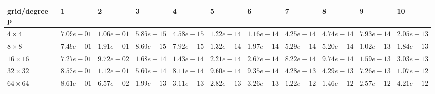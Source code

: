 \begin{tabular}{lllllllllll}
\hline
 grid/degree p   & 1          & 2          & 3          & 4          & 5          & 6          & 7          & 8          & 9          & 10         \\
\hline
 $4 \times 4$    & $7.09e-01$ & $1.06e-01$ & $5.86e-15$ & $4.58e-15$ & $1.22e-14$ & $1.16e-14$ & $4.25e-14$ & $4.74e-14$ & $7.93e-14$ & $2.05e-13$ \\
 $8 \times 8$    & $7.49e-01$ & $1.91e-01$ & $8.60e-15$ & $7.92e-15$ & $1.32e-14$ & $1.97e-14$ & $5.29e-14$ & $5.20e-14$ & $1.02e-13$ & $1.84e-13$ \\
 $16 \times 16$  & $7.27e-01$ & $9.72e-02$ & $1.68e-14$ & $1.43e-14$ & $2.21e-14$ & $2.67e-14$ & $8.22e-14$ & $9.74e-14$ & $1.59e-13$ & $3.03e-13$ \\
 $32 \times 32$  & $8.53e-01$ & $1.12e-01$ & $5.60e-14$ & $8.11e-14$ & $9.60e-14$ & $9.35e-14$ & $4.28e-13$ & $4.29e-13$ & $7.26e-13$ & $1.07e-12$ \\
 $64 \times 64$  & $8.61e-01$ & $6.57e-02$ & $1.99e-13$ & $3.11e-13$ & $2.82e-13$ & $3.26e-13$ & $1.22e-12$ & $1.46e-12$ & $2.57e-12$ & $4.21e-12$ \\
\hline
\end{tabular}